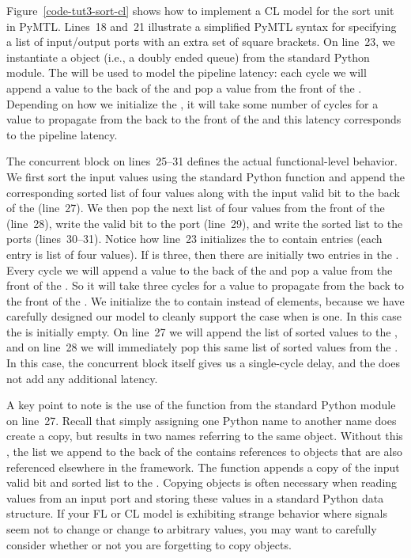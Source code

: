 \documentclass{cbxdoc}
\begin{document}
Figure~\ref{code-tut3-sort-cl} shows how to implement a CL model for the
sort unit in PyMTL. Lines~18 and~21 illustrate a simplified PyMTL syntax
for specifying a list of input/output ports with an extra set of square
brackets. On line~23, we instantiate a  object (i.e., a doubly
ended queue) from the standard Python  module. The
 will be used to model the pipeline latency: each cycle we will
append a value to the back of the  and pop a value from the
front of the . Depending on how we initialize the ,
it will take some number of cycles for a value to propagate from the back
to the front of the  and this latency corresponds to the
pipeline latency.

The  concurrent block on lines~25--31 defines the actual
functional-level behavior. We first sort the input values using the
standard Python  function and append the corresponding sorted
list of four values along with the input valid bit to the back of the
 (line~27). We then pop the next list of four values from the
front of the  (line~28), write the valid bit to the
 port (line~29), and write the sorted list to the 
ports (lines~30--31). Notice how line~23 initializes the  to
contain  entries (each entry is list of four values). If
 is three, then there are initially two entries in the
. Every cycle we will append a value to the back of the
 and pop a value from the front of the . So it will
take three cycles for a value to propagate from the back to the front of
the . We initialize the  to contain 
instead of  elements, because we have carefully designed our
model to cleanly support the case when  is one. In this case
the  is initially empty. On line~27 we will append the list of
sorted values to the , and on line~28 we will immediately pop
this same list of sorted values from the . In this case, the
 concurrent block itself gives us a single-cycle delay, and
the  does not add any additional latency.

A key point to note is the use of the  function from the
standard Python  module on line~27. Recall that simply assigning
one Python name to another name does  create a copy, but results
in two names referring to the same object. Without this ,
the list we append to the back of the  contains references to
 objects that are also referenced elsewhere in the framework.
The  function appends a copy of the input valid bit and
sorted list to the . Copying objects is often necessary when
reading values from an input port and storing these values in a standard
Python data structure. If your FL or CL model is exhibiting strange
behavior where signals seem not to change or change to arbitrary values,
you may want to carefully consider whether or not you are forgetting to
copy objects.
\end{document}
